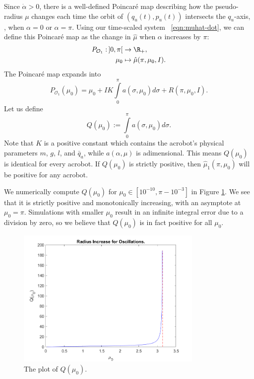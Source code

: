 Since \(\dot{\alpha} > 0\), there is a well-defined Poincar\'{e} map 
describing how the pseudo-radius \(\mu\) changes each time the orbit of \((q_u(t),p_u(t))\)
intersects the \(q_u\)-axis, \ie, when \(\alpha = 0\) or \(\alpha = \pi\).
Using our time-scaled system ~\eqref{eqn:muhat-dot}, we can define this
Poincar\'{e} map as the change in \(\hat{\mu}\) when \(\alpha\) increases by
\(\pi\):
\begin{align*}
    P_{\mathcal{O}_1} : \,]0,\pi[ &\rightarrow \R_+,
    \\
    \mu_0 &\mapsto \hat{\mu}(\pi,\mu_0,I)
    .
\end{align*}
The Poincar\'{e} map expands into
\[
    P_{\mathcal{O}_1}(\mu_0) = \mu_0 + I K \int\limits_0^\pi a(\sigma,\mu_0)d\sigma
    + R(\pi,\mu_0,I)
    .
\]
Let us define
\[
    Q(\mu_0) := \int \limits_0^\pi a(\sigma,\mu_0)d\sigma
    .
\]
Note that \(K\) is a positive constant which contains the acrobot's physical
parameters \(m\), \(g\), \(l\), and \(\bar{q}_a\), 
while \(a(\alpha,\mu)\) is adimensional. 
This means \(Q(\mu_0)\) is identical for every acrobot.
If \(Q(\mu_0)\) is strictly positive, then \(\hat{\mu}_1(\pi,\mu_0)\) will be
positive for any acrobot.

We numerically compute \(Q(\mu_0)\) for \(\mu_0 \in [10^{-10}, \pi - 10^{-3}]\)
in Figure \ref{fig:acrobot-Q}. 
We see that it is strictly positive and monotonically increasing, with
an asymptote at \(\mu_0 = \pi\). 
Simulations with smaller \(\mu_0\) result in an infinite integral error due
to a division by zero, so we believe that \(Q(\mu_0)\) is in fact positive for
all \(\mu_0\).

\begin{figure}
    \centering
    \includegraphics[width=0.8\textwidth]{images/Qmu.png}
    \caption{The plot of \(Q(\mu_0)\).}
    \label{fig:acrobot-Q}
\end{figure}


